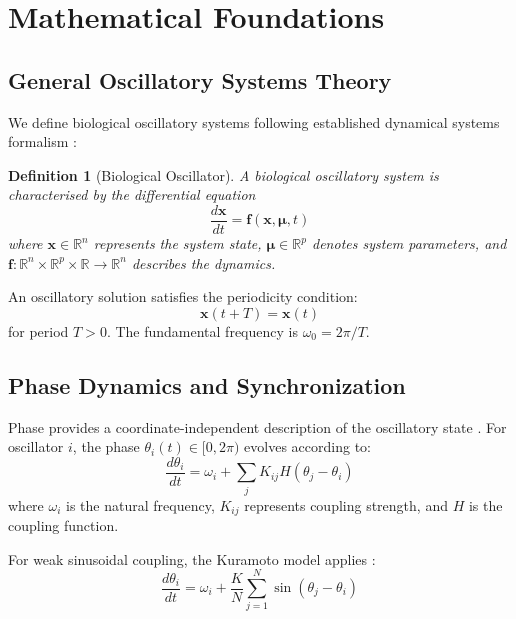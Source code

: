 \documentclass[12pt]{article}
\newtheorem{definition}[theorem]{Definition}
\theoremstyle{remark}
\begin{document}
\section{Mathematical Foundations}

\subsection{General Oscillatory Systems Theory}

We define biological oscillatory systems following established dynamical systems formalism \citep{strogatz2014nonlinear}:

\begin{definition}[Biological Oscillator]
A biological oscillatory system is characterised by the differential equation
\begin{equation}
\frac{d\mathbf{x}}{dt} = \mathbf{f}(\mathbf{x}, \boldsymbol{\mu}, t)
\label{eq:general_oscillator}
\end{equation}
where $\mathbf{x} \in \mathbb{R}^n$ represents the system state, $\boldsymbol{\mu} \in \mathbb{R}^p$ denotes system parameters, and $\mathbf{f}: \mathbb{R}^n \times \mathbb{R}^p \times \mathbb{R} \to \mathbb{R}^n$ describes the dynamics.
\end{definition}

An oscillatory solution satisfies the periodicity condition:
\begin{equation}
\mathbf{x}(t + T) = \mathbf{x}(t)
\label{eq:periodicity}
\end{equation}
for period $T > 0$. The fundamental frequency is $\omega_0 = 2\pi/T$.

\subsection{Phase Dynamics and Synchronization}

Phase provides a coordinate-independent description of the oscillatory state \citep{pikovsky2001synchronization}. For oscillator $i$, the phase $\theta_i(t) \in [0, 2\pi)$ evolves according to:
\begin{equation}
\frac{d\theta_i}{dt} = \omega_i + \sum_{j} K_{ij} H(\theta_j - \theta_i)
\label{eq:phase_dynamics}
\end{equation}
where $\omega_i$ is the natural frequency, $K_{ij}$ represents coupling strength, and $H$ is the coupling function.

For weak sinusoidal coupling, the Kuramoto model applies \citep{kuramoto1984chemical}:
\begin{equation}
\frac{d\theta_i}{dt} = \omega_i + \frac{K}{N}\sum_{j=1}^N \sin(\theta_j - \theta_i)
\label{eq:kuramoto}
\end{equation}
\end{document}
